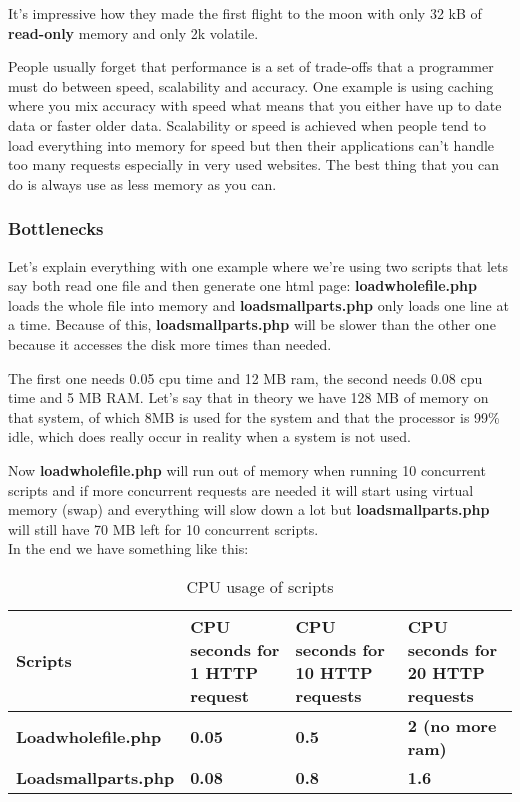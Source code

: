 It's impressive how they made the first flight to the moon with only 32 kB of \textbf{read-only} memory and
only 2k volatile.\cite{graceHopper_history}

People usually forget that performance is a set of trade-offs that a programmer must do between speed,
scalability and accuracy. One example is using caching where you mix accuracy with speed what means
that you either have up to date data or faster older data. Scalability or speed is achieved when people tend
to load everything into memory for speed but then their applications can't handle too many requests
especially in very used websites. The best thing that you can do is always use as less memory as you can.

\subsubsection{Bottlenecks}
Let's explain everything with one example where we're using two scripts that lets say both read one file
and then generate one html page: \textbf{loadwholefile.php} loads the whole file into memory and
\textbf{loadsmallparts.php} only loads one line at a time. Because of this, \textbf{loadsmallparts.php} will be slower
than the other one because it accesses the disk more times than needed.

The first one needs 0.05 \gls{cpu} time and 12 MB \gls{ram}, the second needs 0.08 cpu time and 5 MB RAM.
Let's say that in theory we have 128 MB of memory on that system, of which 8MB is used for the system
and that the processor is 99\% idle, which does really occur in reality when a system is not used.

Now \textbf{loadwholefile.php} will run out of memory when running 10 concurrent scripts and if more
concurrent requests are needed it will start using virtual memory (swap) and everything will slow down a
lot but \textbf{loadsmallparts.php} will still have 70 MB left for 10 concurrent scripts.\\
In the end we have something like this:

\begin{table}[ht!]
\caption{CPU usage of scripts}
\begin{tabular}{|p{4cm}|p{3cm}|p{3cm}|p{3.2cm}|}\hline\rowcolor{myLightGreen}
 {\bf\color{white} Scripts} & {\bf\color{white} CPU seconds for 1 HTTP request} & {\bf\color{white} CPU seconds for 10 HTTP requests} & {\bf\color{white} CPU seconds for 20 HTTP requests} \\ \hline 
 {\bf\color{black} Loadwholefile.php} & {\bf\color{black} 0.05} & {\bf\color{black} 0.5} & {\bf\color{black} 2 (no more ram)} \\ \hline 
 {\bf\color{black} Loadsmallparts.php} & {\bf\color{black} 0.08} & {\bf\color{black} 0.8} & {\bf\color{black} 1.6} \\ \hline 
\end{tabular}
\end{table}

